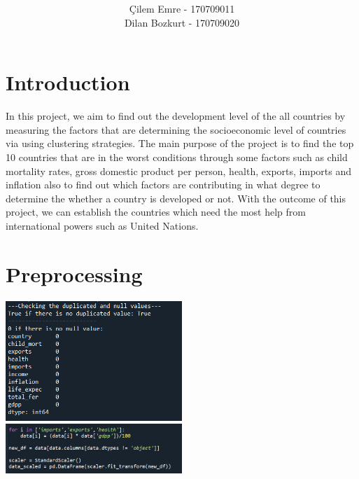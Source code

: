\documentclass[onecolumn]{article}
\title{\spacecaps{\textbf{CENG 3521: Data Mining Final Project}\vspace{0.5cm}
        \large Socioeconomic Status of Countries}\\ \normalsize \spacesc{} }
\author{Çilem Emre - 170709011\\Dilan Bozkurt - 170709020}
\date{}
\begin{document}
\maketitle

\section{Introduction}

In this project, we aim to find out the development level of the all countries by measuring the factors that are determining the socioeconomic level of countries via using clustering strategies. The main purpose of the project is to find the top 10 countries that are in the worst conditions through some factors such as child mortality rates, gross domestic product per person, health, exports, imports and inflation also to find out which factors are contributing in what degree to determine the whether a country is developed or not. With the outcome of this project, we can establish the countries which need the most help from international powers such as United Nations.

\section{Preprocessing}

\begin{center}
    \includegraphics[width=0.50\textwidth]{1.png}
    \includegraphics[width=0.50\textwidth]{scaler.PNG}
\end{center}
\end{document}
